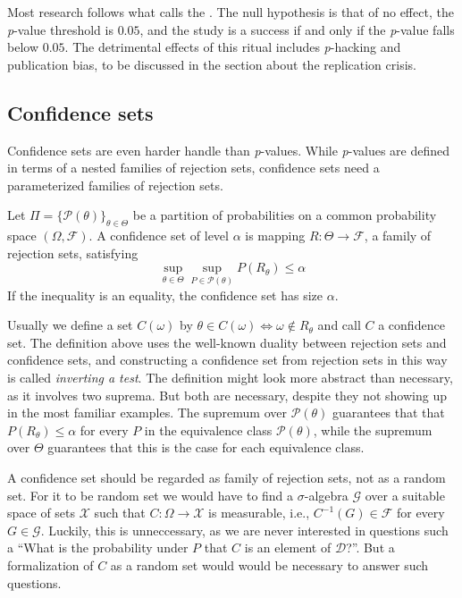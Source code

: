 Most research follows what \textcite{Gigerenzer2004-oc} calls the . The null hypothesis is that of no effect, the \textit{p}-value threshold is $0.05$, and the study is a success if and only if the \textit{p}-value falls below $0.05$. The detrimental effects of this ritual includes \textit{p}-hacking and publication bias, to be discussed in the section about the replication crisis.

\subsection{Confidence sets}
Confidence sets are even harder handle than \emph{p}-values. While
\emph{p}-values are defined in terms of a nested families of rejection
sets, confidence sets need a parameterized families of rejection sets. 
\begin{definition}
\label{def:confidence sets}Let $\Pi=\{\mathcal{P}(\theta)\}_{\theta\in\Theta}$
be a partition of probabilities on a common probability space $(\Omega,\mathcal{F})$.
A confidence set of level $\alpha$ is mapping $R:\Theta\to\mathcal{F}$,
a family of rejection sets, satisfying 
\begin{equation}
\sup_{\theta\in\Theta}\sup_{P\in\mathcal{P}(\theta)}P(R_{\theta})\leq\alpha\label{eq:confidence set}
\end{equation}
If the inequality is an equality, the confidence set has size $\alpha$. 
\end{definition}

Usually we define a set $C(\omega)$ by $\theta\in C(\omega)\iff\omega\notin R_{\theta}$ and call $C$ a confidence set. The definition above uses the well-known duality between rejection sets and confidence sets, and constructing a confidence set from rejection sets in this way is called
\emph{inverting a test}. The definition might look more abstract than necessary, as it involves two suprema. But both are necessary, despite they not showing up in the most familiar examples. The supremum over $\mathcal{P}(\theta)$ guarantees that that $P(R_{\theta})\leq\alpha$
for every $P$ in the equivalence class $\mathcal{P}(\theta)$, while
the supremum over $\Theta$ guarantees that this is the case for each equivalence class.

A confidence set should be regarded as family of rejection sets, not as a random set. For it to be random set we would have to find a $\sigma$-algebra $\mathcal{G}$ over a suitable space of sets $\mathcal{X}$ such that $C:\Omega\to\mathcal{X}$ is measurable, i.e., $C^{-1}(G)\in\mathcal{F}$ for every $G\in\mathcal{G}$. Luckily, this is unneccessary, as we are never interested in questions such a ``What is the probability under $P$ that $C$ is an element of $\mathcal{D}$?''. But a formalization of $C$ as a random set would would be necessary to answer such questions.

